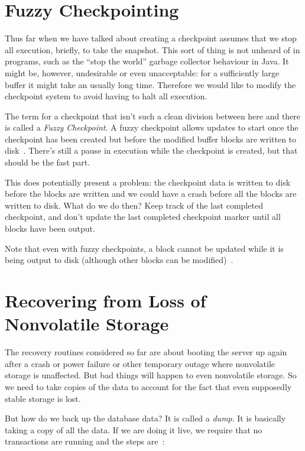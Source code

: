 




\section*{Fuzzy Checkpointing}

Thus far when we have talked about creating a checkpoint assumes that we stop all execution, briefly, to take the snapshot. This sort of thing is not unheard of in programs, such as the ``stop the world'' garbage collector behaviour in Java. It might be, however, undesirable or even unacceptable: for a sufficiently large buffer it might take an usually long time. Therefore we would like to modify the checkpoint system to avoid having to halt all execution.

The term for a checkpoint that isn't such a clean division between here and there is called a \textit{Fuzzy Checkpoint}. A fuzzy checkpoint allows updates to start once the checkpoint has been created but before the modified buffer blocks are written to disk~\cite{fds}. There's still a pause in execution while the checkpoint is created, but that should be the fast part.

This does potentially present a problem: the checkpoint data is written to disk before the blocks are written and we could have a crash before all the blocks are written to disk. What do we do then? Keep track of the last completed checkpoint, and don't update the last completed checkpoint marker until all blocks have been output.

Note that even with fuzzy checkpoints, a block cannot be updated while it is being output to disk (although other blocks can be modified)~\cite{dsc}.

\section*{Recovering from Loss of Nonvolatile Storage}

The recovery routines considered so far are about booting the server up again after a crash or power failure or other temporary outage where nonvolatile storage is unaffected. But bad things will happen to even nonvolatile storage. So we need to take copies of the data to account for the fact that even supposedly stable storage is lost.

But how do we back up the database data? It is called a \textit{dump}. It is basically taking a copy of all the data. If we are doing it live, we require that no transactions are running and the steps are~\cite{dsc}:

